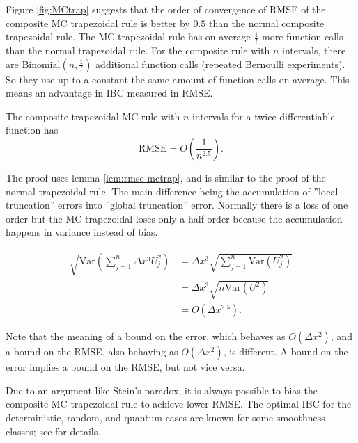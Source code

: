 \documentclass[a4paper,12pt]{article}
\begin{document}
Figure \ref{fig:MCtrap} suggests that the order of convergence of RMSE of the
composite MC trapezoidal rule is better by $0.5$ than the normal composite trapezoidal rule.
The MC trapezoidal rule has on average $\frac{1}{l}$ more function calls than
the normal trapezoidal rule. For the composite rule with $n$ intervals,
there are $\text{Binomial}(n,\frac{1}{l})$ additional function calls
(repeated Bernoulli experiments). So they use up to a constant the same amount
of function calls on average. This means an advantage in IBC measured in RMSE. \\

\begin{theorem} \label{thrm:order trap}
    The composite trapezoidal MC rule  with $n$ intervals
    for a twice differentiable function has
    \begin{equation}
        \text{RMSE} =O\left(\frac{1}{n^{2.5}} \right) .
    \end{equation}
\end{theorem}

The proof uses lemma \ref{lem:rmse mctrap},
and is similar to the proof of the normal
trapezoidal rule. The main difference being the
accumulation of ''local truncation'' errors into ''global truncation'' error.
Normally there is a loss of one order but the MC trapezoidal loses only a half order
because the accumulation happens in variance instead of bias.

\begin{align}
    \sqrt{\text{Var}\left(\sum_{j=1}^{n}  \Delta x^{3}U_{j}^{2}\right)}
     & = \Delta x^{3} \sqrt{ \sum_{j=1}^{n}\text{Var} (U_{j}^{2})} \\
     & = \Delta x^{3} \sqrt{ n \text{Var}(U^{2})}                  \\
     & = O( \Delta x^{2.5}).
\end{align}

Note that the meaning of a bound on the error, which behaves as $O(\Delta x^{2})$,
and a bound on the RMSE, also behaving as $O(\Delta x^{2})$, is different.
A bound on the error implies a bound on the RMSE, but not vice versa.

\begin{related}
    Due to an argument like Stein's paradox,
    it is always possible to bias the composite MC trapezoidal
    rule to achieve lower RMSE.
    The optimal IBC for the deterministic, random, and quantum cases are known
    for some smoothness classes; see \cite{heinrich_optimal_2001} for details.
\end{related}
\end{document}
